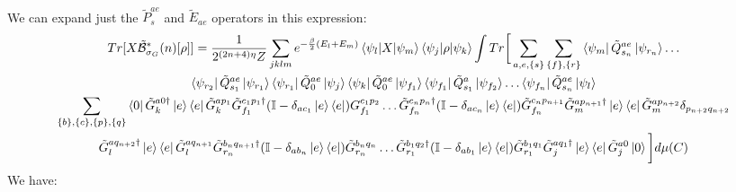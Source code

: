\documentclass[aps,floatfix,10pt,amssymb,amsfont,amsmath,superscriptaddress,float,nofootinbib,longbibliography,nobalancelastpage,twocolumn]{revtex4-2}
\begin{document}
\begin{widetext}
\begin{multline}
\end{multline}
We can expand just the $\tilde P_s^{ae}$ and $\tilde E_{ae}$ operators in this expression:
\begin{multline}
    Tr[X\tilde{\mathcal{B}}^*_{\sigma_G}(n)[\rho]] = \frac{1}{2^{(2n+4)\eta}Z}\sum_{jklm}e^{-\frac{\beta}{2}(E_l+E_m)}\braket{\psi_l|X|\psi_m}\braket{\psi_j|\rho|\psi_k}\int Tr\bigg[ \sum_{a,e,\{s\}}\sum_{\{f\}, \{r\}}\bra{\psi_m}\tilde Q^{ae}_{s_n}\ket{\psi_{r_{n}}}\ldots \\\bra{\psi_{r_2}}\tilde Q^{ae}_{s_1}\ket{\psi_{r_1}}\bra{\psi_{r_1}}\tilde Q^{ae}_0\ket{\psi_j}
\bra{\psi_k}\tilde Q^{ae}_0\ket{\psi_{f_1}}\bra{\psi_{f_1}}\tilde Q^a_{s_1}\ket{\psi_{f_2}}\ldots \bra{\psi_{f_{n}}}\tilde Q^{ae}_{s_n}\ket{\psi_l}\\
\sum_{\{b\}, \{c\}, \{p\}, \{q\}}
\bra{0}\tilde G^{a0\dagger}_k\ket{e}\bra{e}\tilde G^{ap_1}_k\tilde G^{c_1p_1\dagger}_{f_1}(\mathbb{I} - \delta_{ac_1}\ket{e}\bra{e})G^{c_1p_2}_{f_1}\ldots \tilde G^{c_np_n\dagger}_{f_n}(\mathbb{I} - \delta_{ac_n}\ket{e}\bra{e})\tilde G^{c_np_{n+1}}_{f_n}\tilde G^{ap_{n+1}\dagger}_{m}\ket{e}\bra{e}\tilde G^{ap_{n+2}}_m \delta_{p_{n+2}q_{n+2}}\\\tilde G^{aq_{n+2}\dagger}_l \ket{e}\bra{e}\tilde G^{aq_{n+1}}_l \tilde G^{b_{n}q_{n+1}\dagger}_{r_n}(\mathbb{I} - \delta_{ab_n}\ket{e}\bra{e})\tilde G^{b_nq_n}_{r_n}\ldots \tilde G^{b_1q_2\dagger}_{r_1}(\mathbb{I} - \delta_{ab_1}\ket{e}\bra{e})\tilde G^{b_1q_1}_{r_1}\tilde G^{aq_1\dagger}_j\ket{e}\bra{e}\tilde G^{a0}_j\ket{0}\bigg]d\mu(C)
\end{multline}
We have:

\end{widetext}
\end{document}
